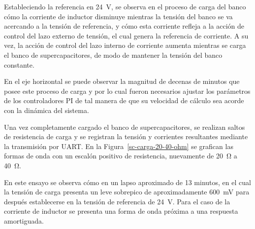 Estableciendo la referencia en \SI{24}{\volt}, se observa en el proceso de carga del banco cómo la corriente de inductor disminuye mientras la tensión del banco se va acercando a la tensión de referencia, y cómo esta corriente refleja a la acción de control del lazo externo de tensión, el cual genera la referencia de corriente. A su vez, la acción de control del lazo interno de corriente aumenta mientras se carga el banco de supercapacitores, de modo de mantener la tensión del banco constante.

En el eje horizontal se puede observar la magnitud de decenas de minutos que posee este proceso de carga y por lo cual fueron necesarios ajustar los parámetros de los controladores PI de tal manera de que su velocidad de cálculo sea acorde con la dinámica del sistema.

Una vez completamente cargado el banco de supercapacitores, se realizan saltos de resistencia de carga y se registran la tensión y corrientes resultantes mediante la transmisión por UART. En la Figura~\ref{sc-carga-20-40-ohm} se grafican las formas de onda con un escalón positivo de resistencia, nuevamente de \SI{20}{\ohm} a \SI{40}{\ohm}.

En este ensayo se observa cómo en un lapso aproximado de 13 minutos, en el cual la tensión de carga presenta un leve sobrepico de aproximadamente \SI{600}{\milli\volt} para después establecerse en la tensión de referencia de \SI{24}{\volt}. Para el caso de la corriente de inductor se presenta una forma de onda próxima a una respuesta amortiguada.


